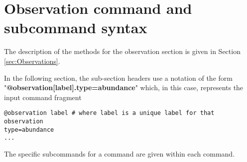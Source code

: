 \subsection{}


\subsection{}


\subsection{}


\subsection{}


\subsection{}


\subsection{}


\section{Observation command and subcommand syntax\label{syntax:Observations}}

The description of the methods for the observation section is given in Section \ref{sec:Observations}.

In the following section, the sub-section headers use a notation of the form "\textbf {@observation[label].type=abundance}" which, in this case, represents the input command fragment
{\small{\begin{verbatim}
@observation label # where label is a unique label for that observation
type=abundance
...
\end{verbatim}}}
The specific subcommands for a command are given within each command.

\subsection{}\label{syntax:ObservationTypes}

